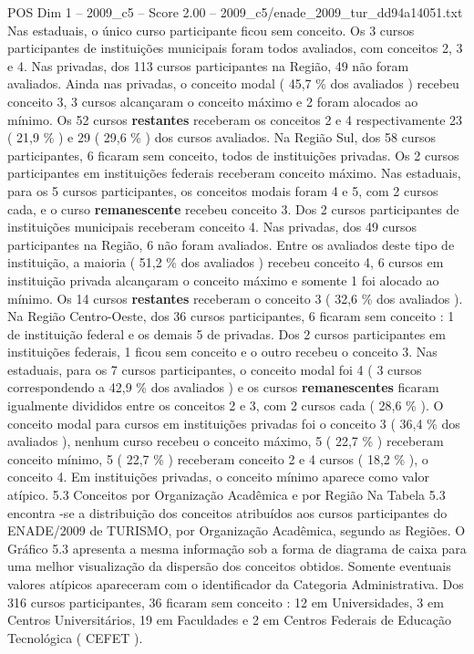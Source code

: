 \begin{textsample}{POS Dim 1 – 2009\_c5 – Score 2.00 – 2009\_c5/enade\_2009\_tur\_dd94a14051.txt}
Nas estaduais, o único curso participante ficou sem conceito.
Os 3 cursos participantes de instituições municipais foram todos avaliados, com conceitos 2, 3 e 4.
Nas privadas, dos 113 cursos participantes na Região, 49 não foram avaliados.
Ainda nas privadas, o conceito modal ( 45,7 \% dos avaliados ) recebeu conceito 3, 3 cursos alcançaram o conceito máximo e 2 foram alocados ao mínimo.
Os 52 cursos \textbf{restantes} receberam os conceitos 2 e 4 respectivamente 23 ( 21,9 \% ) e 29 ( 29,6 \% ) dos cursos avaliados.
Na Região Sul, dos 58 cursos participantes, 6 ficaram sem conceito, todos de instituições privadas.
Os 2 cursos participantes em instituições federais receberam conceito máximo.
Nas estaduais, para os 5 cursos participantes, os conceitos modais foram 4 e 5, com 2 cursos cada, e o curso \textbf{remanescente} recebeu conceito 3.
Dos 2 cursos participantes de instituições municipais receberam conceito 4.
Nas privadas, dos 49 cursos participantes na Região, 6 não foram avaliados.
Entre os avaliados deste tipo de instituição, a maioria ( 51,2 \% dos avaliados ) recebeu conceito 4, 6 cursos em instituição privada alcançaram o conceito máximo e somente 1 foi alocado ao mínimo.
Os 14 cursos \textbf{restantes} receberam o conceito 3 ( 32,6 \% dos avaliados ).
Na Região Centro-Oeste, dos 36 cursos participantes, 6 ficaram sem conceito : 1 de instituição federal e os demais 5 de privadas.
Dos 2 cursos participantes em instituições federais, 1 ficou sem conceito e o outro recebeu o conceito 3.
Nas estaduais, para os 7 cursos participantes, o conceito modal foi 4 ( 3 cursos correspondendo a 42,9 \% dos avaliados ) e os cursos \textbf{remanescentes} ficaram igualmente divididos entre os conceitos 2 e 3, com 2 cursos cada ( 28,6 \% ).
O conceito modal para cursos em instituições privadas foi o conceito 3 ( 36,4 \% dos avaliados ), nenhum curso recebeu o conceito máximo, 5 ( 22,7 \% ) receberam conceito mínimo, 5 ( 22,7 \% ) receberam conceito 2 e 4 cursos ( 18,2 \% ), o conceito 4.
Em instituições privadas, o conceito mínimo aparece como valor atípico. 5.3 Conceitos por Organização Acadêmica e por Região Na Tabela 5.3 encontra -se a distribuição dos conceitos atribuídos aos cursos participantes do ENADE/2009 de TURISMO, por Organização Acadêmica, segundo as Regiões.
O Gráfico 5.3 apresenta a mesma informação sob a forma de diagrama de caixa para uma melhor visualização da dispersão dos conceitos obtidos.
Somente eventuais valores atípicos apareceram com o identificador da Categoria Administrativa.
Dos 316 cursos participantes, 36 ficaram sem conceito : 12 em Universidades, 3 em Centros Universitários, 19 em Faculdades e 2 em Centros Federais de Educação Tecnológica ( CEFET ).

\end{textsample}
